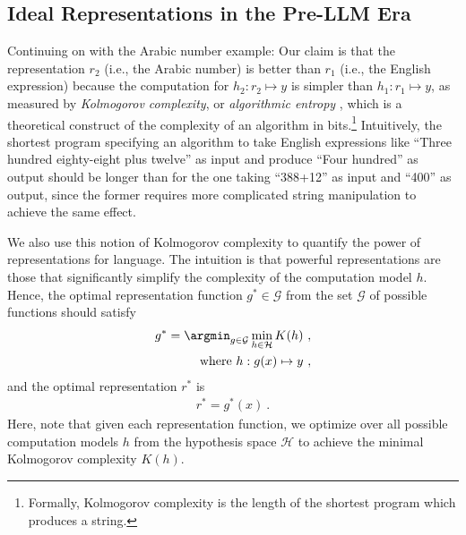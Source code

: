 \subsection{Ideal Representations in the Pre-LLM Era}
\label{sec:ideal}

Continuing on with the Arabic number example:
Our claim is that the representation $r_2$ (i.e., the Arabic number) is better than $r_1$ (i.e., the English expression) because the computation for $h_2: r_2 \mapsto y$ is simpler than $h_1: r_1 \mapsto y$, as measured by \textit{Kolmogorov complexity}, or \textit{algorithmic entropy} \cite{solomonoff1964formal,kolmogorov1965three}, which is a theoretical construct of the complexity of an algorithm in bits.\footnote{Formally, Kolmogorov complexity is the length of the shortest program which produces a string.} Intuitively, the shortest program specifying an algorithm to take English expressions like ``Three hundred eighty-eight plus twelve'' as input and produce ``Four hundred'' as output should be longer than for the one taking ``388+12'' as input and ``400'' as output, since the former requires more complicated string manipulation to achieve the same effect.

We also use this notion of Kolmogorov complexity to quantify the power of representations for language. The intuition is that powerful representations are those that significantly simplify the complexity of the computation model $h$.
Hence, the optimal representation function $g^* \in \mathcal{G}$ from the set $\mathcal{G}$ of possible functions should satisfy
\begin{align}
    g^* = \argmin_{g\in \mathcal{G}} \min_{h\in \mathcal{H}} K(h)
    ~,\label{eq:r}
    \\
    \hfill \text{where } h: g(x) \mapsto y
    ~,\label{eq:perfect_compute}    
\end{align}
and the optimal representation $r^*$ is
\begin{align}
    r^* = g^*(x)
    ~.
    \label{eq:r_res}
\end{align}
Here, note that given each representation function, we optimize over all possible computation models $h$ from the hypothesis space $\mathcal{H}$ to achieve the minimal Kolmogorov complexity $K(h)$.








